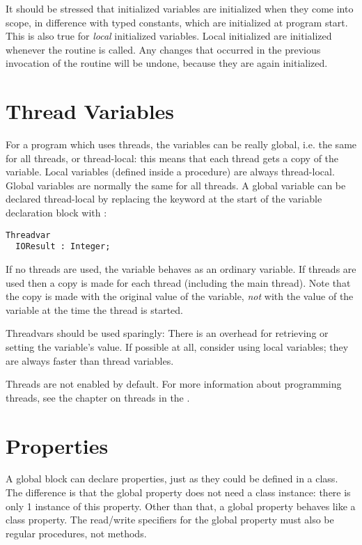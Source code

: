 \begin{remark}
It should be stressed that initialized variables are initialized when they
come into scope, in difference with typed constants, which are initialized 
at program start.
This is also true for {\em local} initialized variables. Local initialized are
initialized whenever the routine is called. Any changes that occurred in the
previous invocation of the routine will be undone, because they are again
initialized.
\end{remark}

\section{Thread Variables}
For a program which uses threads, the variables can be really global, i.e. the same for all 
threads, or thread-local: this means that each thread gets a copy of the variable. 
Local variables (defined inside a procedure) are always thread-local. Global 
variables are normally the same for all threads. A global variable can be 
declared thread-local by replacing the  keyword at the start of the 
variable declaration block with :
\begin{verbatim}
Threadvar
  IOResult : Integer;
\end{verbatim}
If no threads are used, the variable behaves as an ordinary variable. 
If threads are used then a copy is made 
for each thread (including the main thread). Note that the copy is 
made with the original value  of the variable, {\em not} with the 
value of the variable at the time the thread is started.

Threadvars should be used sparingly: There is an overhead for retrieving 
or setting the variable's value. If possible at all, consider using local 
variables; they are always faster than thread variables.

Threads are not enabled by default. For more information about programming 
threads, see the chapter on threads in the \progref.

\section{Properties}
A global block can declare properties, just as they could be defined in a
class. The difference is that the global property does not need a class
instance: there is only 1 instance of this property. Other than that, a
global property behaves like a class property. The read/write specifiers for
the global property must also be regular procedures, not methods.

